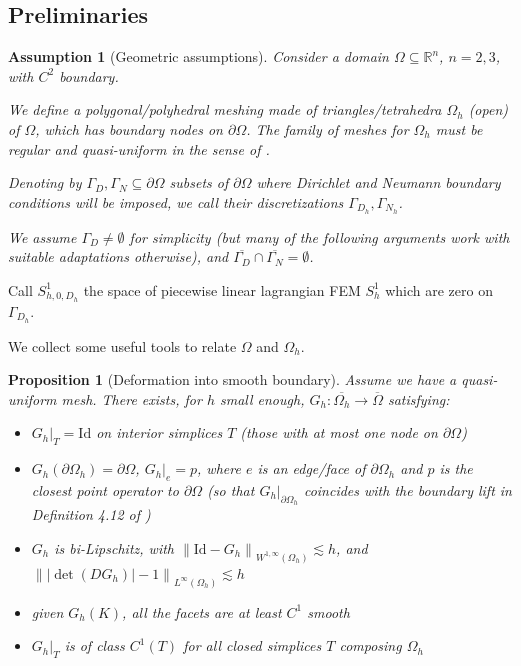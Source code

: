 \documentclass[english,a4paper,9pt,oneside]{scrbook}	%
\theoremstyle{break}
\newtheorem{prop}[equation]{Proposition}
\newtheorem{ass}[equation]{Assumption}
\theoremstyle{remark}
\newcommand{\mR}{\mathbb{R}}
\newcommand{\norm}[1]{\left\lVert#1\right\rVert}
\newcommand{\id}{\text{Id}}
\begin{document}
\begin{appendices}
\section{Preliminaries}

\begin{ass}[Geometric assumptions]
\label{ass:geo_ass_discr}
Consider a domain $\Omega \subseteq \mR^n$, $n=2,3$, with $C^2$ boundary.

We define a polygonal/polyhedral meshing made of triangles/tetrahedra $\Omega_h$ (open) of $\Omega$, which has boundary nodes on $\partial \Omega$. The family of meshes for $\Omega_h$ must be regular and quasi-uniform in the sense of \cite{brenner_scott}.

Denoting by $\Gamma_D, \Gamma_N \subseteq \partial \Omega$ subsets of $\partial \Omega$ where Dirichlet and Neumann boundary conditions will be imposed, we call their discretizations $\Gamma_{D_h}, \Gamma_{N_h}$.

We assume $\Gamma_D \neq \emptyset $ for simplicity (but many of the following arguments work with suitable adaptations otherwise), and $\overline{\Gamma_D}\cap \overline{\Gamma_N} = \emptyset$.

\end{ass}

Call $S^1_{h,0,D_h} $ the space of piecewise linear lagrangian FEM $S^1_h$ which are zero on $\Gamma_{D_h}$.

We collect some useful tools to relate $\Omega$ and $\Omega_h$.

\begin{prop}[Deformation into smooth boundary]
\label{prop:G_h}
Assume we have a quasi-uniform mesh. There exists, for $h$ small enough, $G_h: \overline{\Omega_h} \rightarrow \overline{\Omega}$ satisfying:

\begin{itemize}
	\item $G_h|_T = \id$ on interior simplices $T$ (those with at most one node on $\partial \Omega$)
	\item $G_h(\partial \Omega_h) = \partial \Omega$, $G_h|_e=p$, where $e$ is an edge/face of $\partial \Omega_h$ and $p$ is the closest point operator to $\partial \Omega$ (so that $G_h|_{\partial \Omega_h}$ coincides with the boundary lift in Definition 4.12 of \cite{elliott})
	\item $G_h$ is bi-Lipschitz, with $\norm{\id -G_h}_{W^{1,\infty}(\Omega_h)}\lesssim h$, and $\norm{|\det(DG_h)|-1}_{L^\infty(\Omega_h)}\lesssim h$
	\item given $G_h(K)$, all the facets are at least $C^1$ smooth
	\item $G_h|_T$ is of class $C^1(T)$ for all closed simplices $T$ composing $\Omega_h$
\end{itemize}


\end{prop}
\end{appendices}
\end{document}
